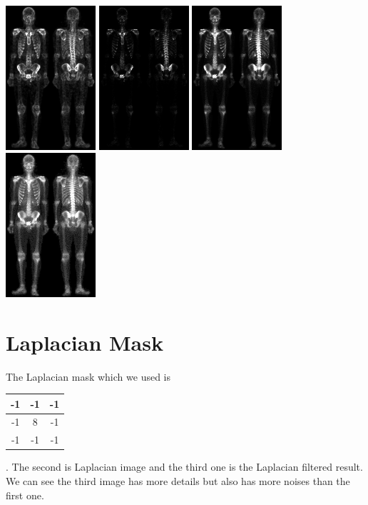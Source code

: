 \documentclass{article}
\begin{document}
\includegraphics[width=0.25\textwidth]{../data/average_sobel_skeleton_orig.jpg}
\includegraphics[width=0.25\textwidth]{../data/product_skeleton_orig.jpg}
\includegraphics[width=0.25\textwidth]{../data/mix_skeleton_orig.jpg}
\includegraphics[width=0.25\textwidth]{../data/gamma_skeleton_orig.jpg}

\section{Laplacian Mask}
The Laplacian mask which we used is 
\begin{tabular}{|c|c|c|}
	\hline -1&-1&-1\\
	\hline -1&8&-1\\
	\hline -1&-1&-1\\
	\hline
\end{tabular}. 
The second is Laplacian image and the third one is the Laplacian filtered result. We can see the third image has more details but also has more noises than the first one.
\end{document}
